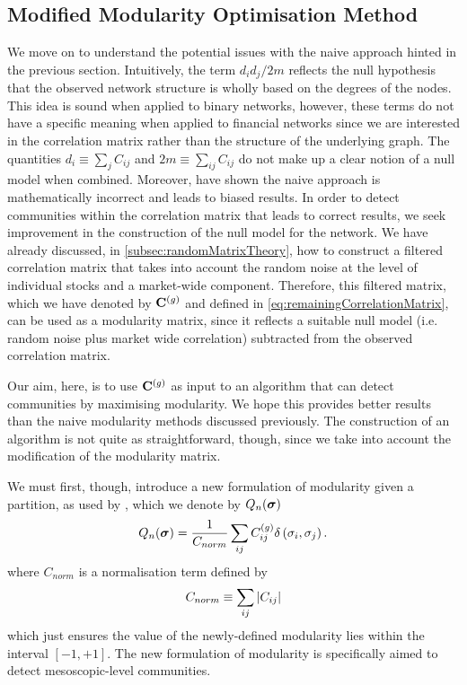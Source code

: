 
\subsection{Modified Modularity Optimisation Method}
\label{subsec:modifiedModularityOptimisationMethod}

We move on to understand the potential issues with the naive approach hinted in the previous section. Intuitively, the term $d_{i}d_{j}/2m$ reflects the null hypothesis that the observed network structure is wholly based on the degrees of the nodes.
This idea is sound when applied to binary networks, however, these terms do not have a specific meaning when applied to financial networks since we are interested in the correlation matrix rather than the structure of the underlying graph.
The quantities $d_{i} \equiv \sum_{j} C_{ij}$ and $2m \equiv \sum_{ij} C_{ij}$ do not make up a clear notion of a null model when combined.
Moreover, \cite{MG13} have shown the naive approach is mathematically incorrect and leads to biased results.
In order to detect communities within the correlation matrix that leads to correct results, we seek improvement in the construction of the null model for the network.
We have already discussed, in \cref{subsec:randomMatrixTheory}, how to construct a filtered correlation matrix that takes into account the random noise at the level of individual stocks and a market-wide component.
Therefore, this filtered matrix, which we have denoted by $\mathbf C^{(g)}$ and defined in \cref{eq:remainingCorrelationMatrix}, can be used as a modularity matrix, since it reflects a suitable null model (i.e. random noise plus market wide correlation) subtracted from the observed correlation matrix.

Our aim, here, is to use $\mathbf C^{(g)}$ as input to an algorithm that can detect communities by maximising modularity. We hope this provides better results than the naive modularity methods discussed previously. The construction of an algorithm is not quite as straightforward, though, since we take into account the modification of the modularity matrix.

We must first, though, introduce a new formulation of modularity given a partition, as used by \cite{MG13}, which we denote by $Q_{n}(\vecvar{\sigma})$
\begin{equation}
\label{eq:newModularityFinancialNetworks}
	Q_{n}(\vecvar{\sigma}) = \frac{1}{C_{norm}} \sum_{ij} C^{(g)}_{ij} \delta \left( \sigma_{i},\sigma_{j} \right).
\end{equation}
where $C_{norm}$ is a normalisation term defined by 
\begin{equation}
\label{eq:newModularityNormalisationConstantFinancialNetworks}
	C_{norm} \equiv \sum_{ij} \left\vert C_{ij}\right\vert
\end{equation}
which just ensures the value of the newly-defined modularity lies within the interval $[-1,+1]$.
The new formulation of modularity is specifically aimed to detect mesoscopic-level communities.


